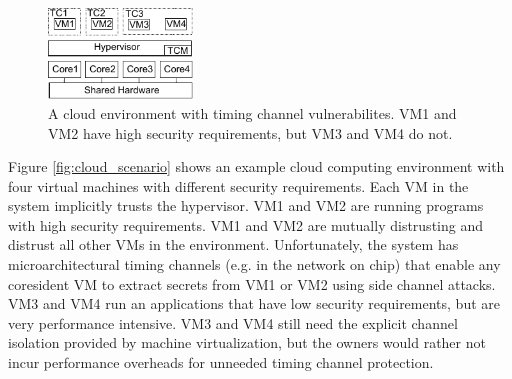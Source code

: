     \begin{figure}
        \begin{center}
            \includegraphics[width=1.51in]{figs/cloud_tcs.pdf}
            \caption{A cloud environment with timing channel vulnerabilites. 
             VM1 and VM2 have high security requirements, but VM3 and VM4 do 
             not.}
            \label{fig:cloud_tcs}
        \end{center}
    \end{figure}

Figure \ref{fig:cloud_scenario} shows an example cloud computing environment 
with four virtual machines with different security requirements. Each VM in the 
system implicitly trusts the hypervisor. VM1 and VM2 
are running programs with high security requirements. VM1 and VM2 are mutually 
distrusting and distrust all other VMs in the environment. Unfortunately, the 
system has microarchitectural timing channels (e.g. in the network on chip) 
that enable any coresident VM to extract secrets from VM1 or VM2 using side 
channel attacks. VM3 and VM4 run an applications that have low security 
requirements, but are very performance intensive. VM3 and VM4 still need the 
explicit channel isolation provided by machine virtualization, but the owners 
would rather not incur performance overheads for unneeded timing channel 
protection.

